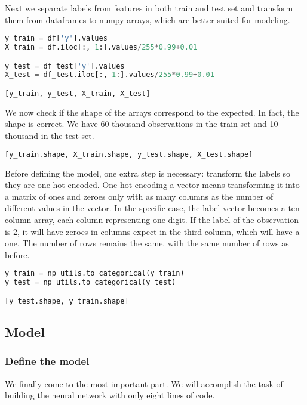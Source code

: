 Next we separate labels from features in both train and test set and transform them from dataframes to numpy arrays, which are better suited for modeling.

\begin{lstlisting}[language=Python]
y_train = df['y'].values
X_train = df.iloc[:, 1:].values/255*0.99+0.01

y_test = df_test['y'].values
X_test = df_test.iloc[:, 1:].values/255*0.99+0.01

[y_train, y_test, X_train, X_test]
\end{lstlisting}

We now check if the shape of the arrays correspond to the expected. In fact, the shape is correct. We have 60 thousand observations in the train set and 10 thousand in the test set.

\begin{lstlisting}[language=Python]
[y_train.shape, X_train.shape, y_test.shape, X_test.shape]
\end{lstlisting}

Before defining the model, one extra step is necessary: transform the labels so they are one-hot encoded. One-hot encoding a vector means transforming it into a matrix of ones and zeroes only with as many columns as the number of different values in the vector. In the specific case, the label vector becomes a ten-column array, each column representing one digit. If the label of the observation is 2, it will have zeroes in columns expect in the third column, which will have a one. The number of rows remains the same. with the same number of rows as before.

\begin{lstlisting}[language=Python]
y_train = np_utils.to_categorical(y_train)
y_test = np_utils.to_categorical(y_test)

[y_test.shape, y_train.shape]
\end{lstlisting}

\subsection{Model}

\subsubsection{Define the model}

We finally come to the most important part. We will accomplish the task of building the neural network with only eight lines of code.

